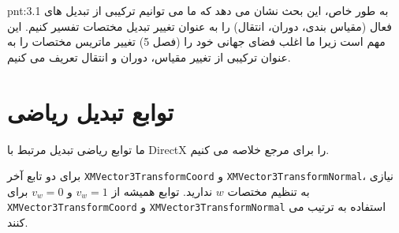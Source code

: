 {\begin{spacing}{1.5}
        \begin{point}{pnt:3.1}
            \Large
            به طور خاص، این بحث نشان می دهد که ما می توانیم ترکیبی از تبدیل های فعال (مقیاس بندی، دوران، انتقال) را به عنوان تغییر تبدیل مختصات تفسیر کنیم.
            این مهم است زیرا ما اغلب فضای جهانی خود را (فصل 5) تغییر ماتریس مختصات را به عنوان ترکیبی از تغییر مقیاس، دوران و انتقال تعریف می کنیم.
        \end{point}
    \end{spacing}
}


\section{\textbf{توابع تبدیل ریاضی }}
\label{sec:3.5}
{
    \Large
    \begin{spacing}{1.5}
        ما توابع ریاضی تبدیل مرتبط با DirectX را برای مرجع خلاصه می کنیم.

        \textbf{\vspace{6pt}}
        \lr{}
        \textbf{\vspace{6pt}}

        برای دو تابع آخر \texttt{XMVector3TransformCoord} و \texttt{XMVector3TransformNormal}، نیازی به تنظیم مختصات $w$ ندارید.
        توابع همیشه از $v_{w}=1$ و $v_{w}=0$ برای \texttt{XMVector3TransformCoord} و \texttt{XMVector3TransformNormal} استفاده به ترتیب می کنند.
    \end{spacing}
}
\newpage


